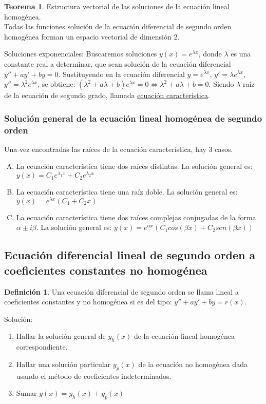 \documentclass[10pt]{article}
\theoremstyle{definition}
\newtheorem{definition}{Definición}[section]
\newtheorem{theorem}{Teorema}[section]
\begin{document}
\begin{theorem}{Estructura vectorial de las soluciones de la ecuación lineal homogénea.}\\
	Todas las funciones solución de la ecuación diferencial de segundo orden homogénea forman un espacio vectorial de dimensión 2.
\end{theorem}
Soluciones exponenciales: Buscaremos soluciones $y(x)=e^{\lambda x}$, donde $\lambda$ es una constante real a determinar, que sean solución de la ecuación diferencial $y''+ay'+by=0$. Sustituyendo en la ecuación diferencial $y=e^{\lambda x}$, $y'=\lambda e^{\lambda x}$, $y''=\lambda ^{2}e^{\lambda x}$, se obtiene: $(\lambda ^2+a\lambda+b)e^{\lambda x}=0\Leftrightarrow \lambda ^2+a\lambda+b=0$. Siendo $\lambda$ raíz de la ecuación de segundo grado, llamada \underline{ecuación caracteristica}.
\subsubsection{Solución general de la ecuación lineal homogénea de segundo orden}
Una vez encontradas las raíces de la ecuación característica, hay 3 casos.
\begin{enumerate}[A)]
	\item La ecuación característica tiene dos raíces distintas. La solución general es: $y(x)=C_1e^{\lambda_1 x}+C_2e^{\lambda_2 x}$
	\item La ecuación característica tiene una raíz doble. La solución general es: $y(x)=e^{\lambda x}(C_1+C_2 x)$
	\item La ecuación característica tiene dos raíces complejas conjugadas de la forma $\alpha\pm i\beta$. La solución general es: $y(x)=e^{\alpha x}(C_1 cos(\beta x)+C_2 sen(\beta x))$
\end{enumerate}
\subsection{Ecuación diferencial lineal de segundo orden a coeficientes constantes no homogénea}
\begin{definition}
	Una ecuación diferencial de segundo orden se llama lineal a coeficientes constantes y no homogénea si es del tipo: $y''+ay'+by=r(x)$.
\end{definition}
Solución:
\begin{enumerate}
	\item Hallar la solución general de $y_h(x)$ de la ecuación lineal homogénea correspondiente.
	\item Hallar una solución particular $y_p(x)$ de la ecuación no homogénea dada usando el método de coeficientes indeterminados.
	\item Sumar $y(x)=y_h(x)+y_p(x)$
\end{enumerate}
\end{document}
